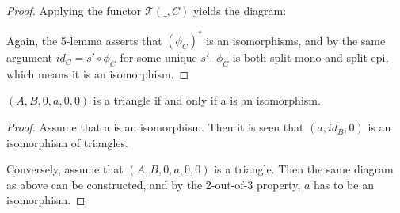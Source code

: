 \begin{proof}
        Applying the functor $\mathcal{T}(\_,C)$ yields the diagram:
        \begin{center}
        \end{center}
        Again, the 5-lemma asserts that $(\phi_C)^*$ is an isomorphisms, and by the same argument $id_{C} = s'\circ\phi_C$ for some unique $s'$. $\phi_C$ is both split mono and split epi, which means it is an isomorphism.
    \end{proof}

    \begin{corollary}
        $(A,B,0,a,0,0)$ is a triangle if and only if a is an isomorphism.
    \end{corollary}

    \begin{proof}
        Assume that a is an isomorphism. Then it is seen that $(a,id_B,0)$ is an isomorphism of triangles.
        \begin{center}
        \end{center}
        Conversely, assume that $(A,B,0,a,0,0)$ is a triangle. Then the same diagram as above can be constructed, and by the 2-out-of-3 property, $a$ has to be an isomorphism.
    \end{proof}

